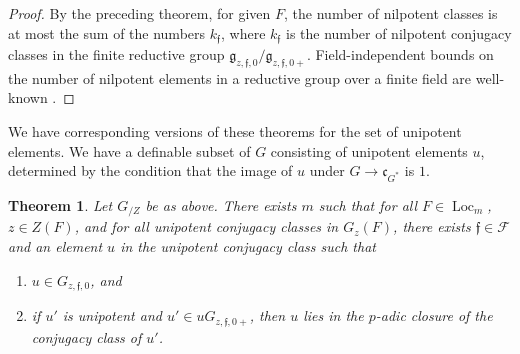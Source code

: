 \documentclass[12pt]{amsart}
\newcommand{\op}[1]{\operatorname{#1}}
\def\s{{\mathfrak{f}}}
\newcommand{\cF}{\mathcal{F}}
\newcommand{\fg}{\mathfrak{g}}
\newcommand{\fc}{\mathfrak{c}}
\theoremstyle{plain}
\newtheorem{theorem}[thm]{Theorem}
\theoremstyle{definition}
\begin{document}
\begin{proof} By the preceding theorem, for given $F$, the number of
  nilpotent classes is at most the sum of the numbers $k_\s$, where
  $k_\s$ is the number of nilpotent conjugacy classes in the finite
  reductive group $\fg_{z,\s,0}/\fg_{z,\s,0+}$.  Field-independent
  bounds on the number of nilpotent elements in a reductive
  group over a finite field are well-known \cite{carter1985finite}.
\end{proof}

We have corresponding versions of these theorems for the set of
unipotent elements.  We have a definable subset of $G$ consisting of
unipotent elements $u$, determined by the condition that the image of
$u$ under $G\to \fc_{G^*}$ is $1$.

\begin{theorem} Let $G_{/Z}$ be as above.  There exists
  $m$ such that for all $F\in \op{Loc}_m$, $z\in Z(F)$, and for all unipotent
  conjugacy classes in $G_z(F)$, there exists $\s\in \cF$ and an element
  $u$ in the unipotent conjugacy class such that
\begin{enumerate}
   \item $u\in G_{z,\s,0}$, and
   \item if $u'$ is unipotent and $u'\in u G_{z,\s,0+}$, then $u$
     lies in the $p$-adic closure of the conjugacy class of $u'$.
\end{enumerate}
\end{theorem}
\end{document}

